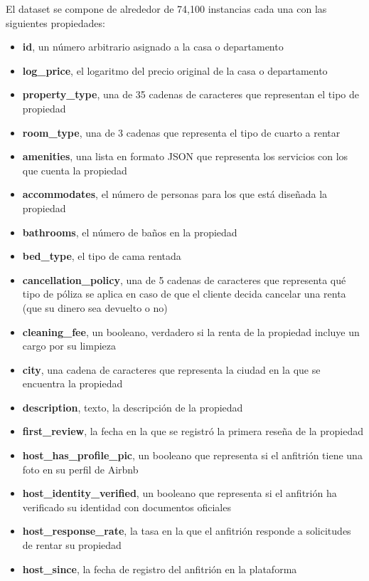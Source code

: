 \documentclass[sigconf,authorversion,nonacm]{acmart}
\begin{document}
El dataset se compone de alrededor de 74,100 instancias cada una con las siguientes propiedades:

\begin{itemize}
  \item \textbf{id}, un número arbitrario asignado a la casa o departamento
  \item \textbf{log\_price}, el logaritmo del precio original de la casa o departamento
  \item \textbf{property\_type}, una de 35 cadenas de caracteres que representan el tipo de propiedad
  \item \textbf{room\_type}, una de 3 cadenas que representa el tipo de cuarto a rentar
  \item \textbf{amenities}, una lista en formato JSON que representa los servicios con los que cuenta la propiedad
  \item \textbf{accommodates}, el número de personas para los que está diseñada la propiedad
  \item \textbf{bathrooms}, el número de baños en la propiedad
  \item \textbf{bed\_type}, el tipo de cama rentada
  \item \textbf{cancellation\_policy}, una de 5 cadenas de caracteres que representa qué tipo de póliza se aplica en caso de que el cliente decida cancelar una renta (que su dinero sea devuelto o no)
  \item \textbf{cleaning\_fee}, un booleano, verdadero si la renta de la propiedad incluye un cargo por su limpieza
  \item \textbf{city}, una cadena de caracteres que representa la ciudad en la que se encuentra la propiedad
  \item \textbf{description}, texto, la descripción de la propiedad
  \item \textbf{first\_review}, la fecha en la que se registró la primera reseña de la propiedad
  \item \textbf{host\_has\_profile\_pic}, un booleano que representa si el anfitrión tiene una foto en su perfil de Airbnb
  \item \textbf{host\_identity\_verified}, un booleano que representa si el anfitrión ha verificado su identidad con documentos oficiales
  \item \textbf{host\_response\_rate}, la tasa en la que el anfitrión responde a solicitudes de rentar su propiedad
  \item \textbf{host\_since}, la fecha de registro del anfitrión en la plataforma

\end{itemize}
\end{document}
